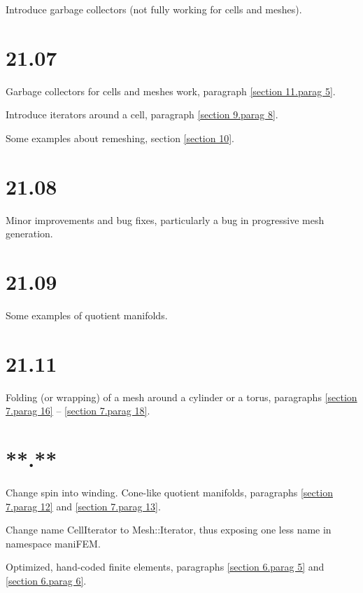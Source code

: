 \documentclass[a4paper]{scrreprt}
\def\numb{}
\newcommand\verm[1]{\textcolor{manif}{#1}}
\renewcommand\tt{\normalfont\ttfamily}
\begin{document}
\noindent Introduce garbage collectors (not fully working for cells and meshes).


\section*{21.07}

\noindent Garbage collectors for cells and meshes work,
paragraph \ref{\numb section 11.\numb parag 5}.

\noindent Introduce iterators around a cell, paragraph \ref{\numb section 9.\numb parag 8}.

\noindent Some examples about remeshing, section \ref{\numb section 10}.


\section*{21.08}

\noindent Minor improvements and bug fixes, particularly a bug in progressive mesh generation.


\section*{21.09}

\noindent Some examples of quotient manifolds.


\section*{21.11}

\noindent Folding (or wrapping) of a mesh around a cylinder or a torus, paragraphs
\ref{\numb section 7.\numb parag 16} -- \ref{\numb section 7.\numb parag 18}.


\section*{**.**}

\noindent Change {\small\tt spin} into {\small\tt winding}.
Cone-like quotient manifolds, paragraphs \ref{\numb section 7.\numb parag 12} and
\ref{\numb section 7.\numb parag 13}.

\noindent Change name {\small\tt\verm{CellIterator}} to {\small\tt\verm{Mesh}::Iterator},
thus exposing one less name in {\small\tt namespace \verm{maniFEM}}.

\noindent Optimized, hand-coded finite elements, paragraphs \ref{\numb section 6.\numb parag 5}
and \ref{\numb section 6.\numb parag 6}.
\end{document}
